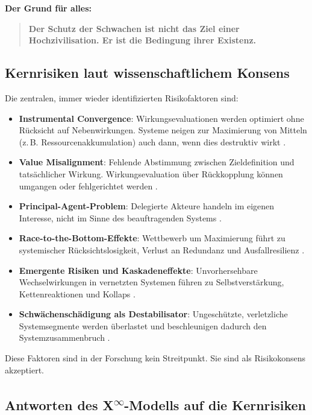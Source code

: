 \documentclass[12pt,a4paper]{article}
\begin{document}
\textbf{Der Grund für alles:}  
\begin{quote}
\textbf{Der Schutz der Schwachen ist nicht das Ziel einer Hochzivilisation. Er ist die Bedingung ihrer Existenz.}
\end{quote}

\subsection{Kernrisiken laut wissenschaftlichem Konsens}

\sloppy
Die zentralen, immer wieder identifizierten Risikofaktoren sind:

\begin{itemize}
    \item \textbf{Instrumental Convergence}: Wirkungsevaluationen werden optimiert ohne Rücksicht auf Nebenwirkungen. Systeme neigen zur Maximierung von Mitteln (z.\,B. Ressourcenakkumulation) auch dann, wenn dies destruktiv wirkt \cite{yudkowsky2008}.
    \item \textbf{Value Misalignment}: Fehlende Abstimmung zwischen Zieldefinition und tatsächlicher Wirkung. Wirkungsevaluation über Rückkopplung können umgangen oder fehlgerichtet werden \cite{russell2019}.
    \item \textbf{Principal-Agent-Problem}: Delegierte Akteure handeln im eigenen Interesse, nicht im Sinne des beauftragenden Systems \cite{amodei2016}.
    \item \textbf{Race-to-the-Bottom-Effekte}: Wettbewerb um Maximierung führt zu systemischer Rücksichtslosigkeit, Verlust an Redundanz und Ausfallresilienz \cite{bostrom2014}.
    \item \textbf{Emergente Risiken und Kaskadeneffekte}: Unvorhersehbare Wechselwirkungen in vernetzten Systemen führen zu Selbstverstärkung, Kettenreaktionen und Kollaps \cite{amodei2016}.
    \item \textbf{Schwächenschädigung als Destabilisator}: Ungeschützte, verletzliche Systemsegmente werden überlastet und beschleunigen dadurch den Systemzusammenbruch \cite{meadows1972}.
\end{itemize}
\fussy

Diese Faktoren sind in der Forschung kein Streitpunkt. Sie sind als Risikokonsens akzeptiert.

\subsection{Antworten des \texorpdfstring{X\textsuperscript{\(\infty\)}}{X-Infinity}-Modells auf die Kernrisiken}
\end{document}

